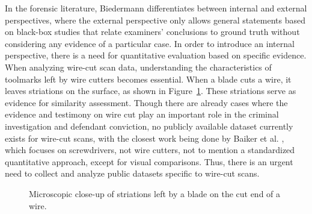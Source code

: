 \documentclass[fleqn,10pt]{wlscirep}
\begin{document}
In the forensic literature, Biedermann
\citep{biedermannStrangePersistenceSource2022} differentiates between
internal and external perspectives, where the external perspective only
allows general statements based on black-box studies that relate
examiners' conclusions to ground truth without considering any evidence
of a particular case. In order to introduce an internal perspective,
there is a need for quantitative evaluation based on specific evidence.
When analyzing wire-cut scan data, understanding the characteristics of
toolmarks left by wire cutters becomes essential. When a blade cuts a
wire, it leaves striations on the surface, as shown in
Figure~\ref{fig-cut-microscope}. These striations serve as evidence for
similarity assessment. Though there are already cases where the evidence
and testimony on wire cut play an important role in the criminal
investigation and defendant conviction, no publicly available dataset
currently exists for wire-cut scans, with the closest work being done by
Baiker et al. \citep{baikerToolmarkVariabilityQuality2015a}, which
focuses on screwdrivers, not wire cutters, not to mention a standardized
quantitative approach, except for visual comparisons. Thus, there is an
urgent need to collect and analyze public datasets specific to wire-cut
scans.

\begin{figure}


\caption{\label{fig-cut-microscope}Microscopic close-up of striations
left by a blade on the cut end of a wire.}

\end{figure}%
\end{document}
